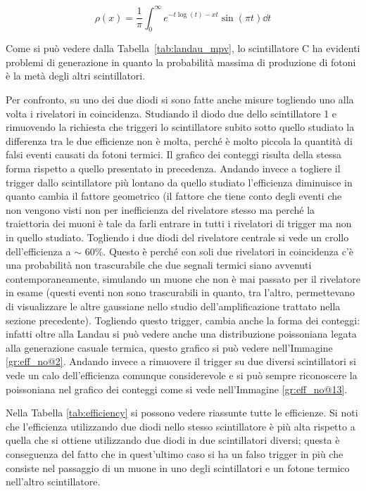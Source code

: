 \begin{equation}
	\rho\left(x\right) = \frac{1}{\pi}\int_0^\infty e^{-t\log(t)-xt}\sin(\pi t) \dd t
	\label{eq:landau}
\end{equation}


Come si pu\`o vedere dalla Tabella~\ref{tab:landau_mpv}, lo scintillatore C ha evidenti problemi di generazione in quanto la probabilit\`a massima di produzione di fotoni \`e la met\`a degli altri scintillatori.

Per confronto, su uno dei due diodi si sono fatte anche misure togliendo uno alla volta i rivelatori in coincidenza. Studiando il diodo due dello scintillatore 1 e rimuovendo la richiesta che triggeri lo scintillatore subito sotto quello studiato la differenza tra le due efficienze non è molta, perché è molto piccola la quantità di falsi eventi causati da fotoni termici. Il grafico dei conteggi risulta della stessa forma rispetto a quello presentato in precedenza. Andando invece a togliere il trigger dallo scintillatore più lontano da quello studiato l'efficienza diminuisce in quanto cambia il fattore geometrico (il fattore che tiene conto degli eventi che non vengono visti non per inefficienza del rivelatore stesso ma perché la traiettoria dei muoni è tale da farli entrare in tutti i rivelatori di trigger ma non in quello studiato. Togliendo i due diodi del rivelatore centrale si vede un crollo dell'efficienza a $\sim$ 60\%. Questo \`e perch\'e con soli due rivelatori in coincidenza c'\`e una probabilit\`a non trascurabile che due segnali termici siano avvenuti contemporaneamente, simulando un muone che non \`e mai passato per il rivelatore in esame (questi eventi non sono trascurabili in quanto, tra l'altro, permettevano di visualizzare le altre gaussiane nello studio dell'amplificazione trattato nella sezione precedente). Togliendo questo trigger, cambia anche la forma dei conteggi: infatti oltre alla Landau si può vedere anche una distribuzione poissoniana legata alla generazione casuale termica, questo grafico si può vedere nell'Immagine \ref{gr:eff_no@2}. Andando invece a rimuovere il trigger su due diversi scintillatori si vede un calo dell'efficienza comunque considerevole e si può sempre riconoscere la poissoniana nel grafico dei conteggi come si vede nell'Immagine \ref{gr:eff_no@13}.\\

Nella Tabella \ref{tab:efficiency} si possono vedere riassunte tutte le efficienze. Si noti che l'efficienza utilizzando due diodi nello stesso scintillatore è più alta rispetto a quella che si ottiene utilizzando due diodi in due scintillatori diversi; questa è conseguenza del fatto che in quest'ultimo caso si ha un falso trigger in più che consiste nel passaggio di un muone in uno degli scintillatori e un fotone termico nell'altro scintillatore.

